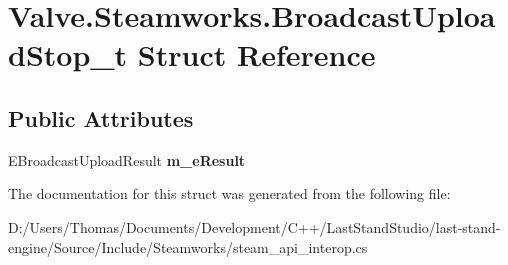 \hypertarget{structValve_1_1Steamworks_1_1BroadcastUploadStop__t}{}\section{Valve.\+Steamworks.\+Broadcast\+Upload\+Stop\+\_\+t Struct Reference}
\label{structValve_1_1Steamworks_1_1BroadcastUploadStop__t}
\subsection*{Public Attributes}
\begin{DoxyCompactItemize}
\item 
\hypertarget{structValve_1_1Steamworks_1_1BroadcastUploadStop__t_a5154fe178aefd6db841dbc2175983558}{}E\+Broadcast\+Upload\+Result {\bfseries m\+\_\+e\+Result}\label{structValve_1_1Steamworks_1_1BroadcastUploadStop__t_a5154fe178aefd6db841dbc2175983558}

\end{DoxyCompactItemize}


The documentation for this struct was generated from the following file\+:\begin{DoxyCompactItemize}
\item 
D\+:/\+Users/\+Thomas/\+Documents/\+Development/\+C++/\+Last\+Stand\+Studio/last-\/stand-\/engine/\+Source/\+Include/\+Steamworks/steam\+\_\+api\+\_\+interop.\+cs\end{DoxyCompactItemize}
